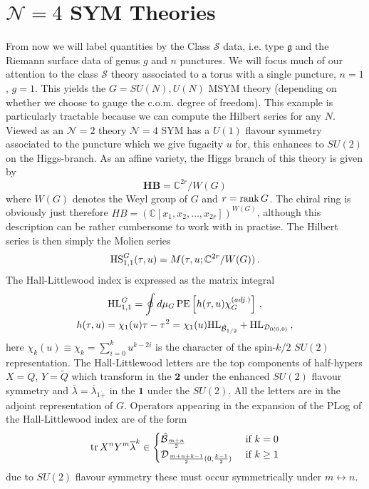 \documentclass[main.tex]{subfiles}
\begin{document}
\section{\texorpdfstring{$\mathcal{N}=4$}{N=4} SYM Theories}
From now we will label quantities by the Class $\mathcal{S}$ data, i.e. type $\mathfrak{g}$ and the Riemann surface data of genus $g$ and $n$ punctures. We will focus much of our attention to the class $\mathcal{S}$ theory associated to a torus with a single puncture, $n=1$, $g=1$. This yields the $G=SU(N),U(N)$ MSYM theory (depending on whether we choose to gauge the c.o.m. degree of freedom). This example is particularly tractable because we can compute the Hilbert series for any $N$. Viewed as an $\mathcal{N}=2$ theory $\mathcal{N}=4$ SYM has a $U(1)$ flavour symmetry associated to the puncture which we give fugacity $u$ for, this enhances to $SU(2)$ on the Higgs-branch.
As an affine variety, the Higgs branch of this theory is given by
\begin{equation}
\mathbf{HB}=\mathbb{C}^{2r}\slash W(G)
\end{equation}
where $W(G)$ denotes the Weyl group of $G$ and $r=\operatorname{rank} G$. The chiral ring is obviously just therefore $HB=(\mathbb{C}[x_1,x_2,\dots,x_{2r}])^{W(G)}$, although this description can be rather cumbersome to work with in practise. The Hilbert series is then simply the Molien series
\begin{equation}
\textrm{HS}^{G}_{1,1}(\tau,u)=M(\tau,u;\mathbb{C}^{2r}\slash W(G))\,.
\end{equation}
The Hall-Littlewood index is expressed as the matrix integral
\begin{gather}
\textrm{HL}^{G}_{1,1}=\oint d\mu_{G}\operatorname{\mathrm{PE}}\left[h(\tau,u)\chi^{(adj.)}_G\right]\,,\\ h(\tau,u)=\chi_1(u)\tau-\tau^2=\chi_1(u)\textrm{HL}_{\hat{\mathcal{B}}_{1/2}}+\textrm{HL}_{\mathcal{D}_{0(0,0)}}\,,
\end{gather}
here $\chi_{k}(u)\equiv\chi_k=\sum_{i=0}^ku^{k-2i}$ is the character of the spin-$k/2$ $SU(2)$ representation. The Hall-Littlewood letters are the top components of half-hypers $X=Q$, $Y=\widetilde{Q}$ which transform in the $\mathbf{2}$ under the enhanced $SU(2)$ flavour symmetry and $\overline{\lambda}=\overline{\lambda}_{1\dot+}$ in the $\mathbf{1}$ under the $SU(2)$. All the letters are in the adjoint representation of $G$. 
Operators appearing in the expansion of the PLog of the Hall-Littlewood index are of the form
\begin{equation}
\operatorname{tr} X^nY^m\overline{\lambda}^k\in\begin{cases}\hat{\mathcal{B}}_{\frac{m+n}{2}}&\text{ if $k=0$}\\
\mathcal{D}_{\frac{m+n+k-1}{2}(0,\frac{k-1}{2})}&\text{ if $k\geq1$}
\end{cases}
\end{equation} 
due to $SU(2)$ flavour symmetry these must occur symmetrically under $m\leftrightarrow n$.
\end{document}
